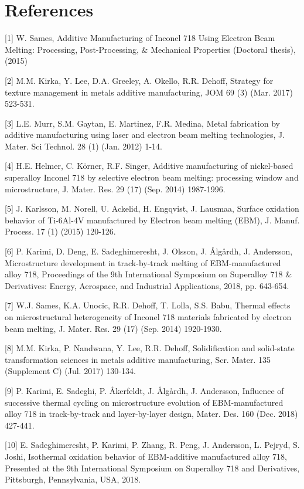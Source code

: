 \documentclass[10pt]{article}
\begin{document}
\section*{References}
[1] W. Sames, Additive Manufacturing of Inconel 718 Using Electron Beam Melting: Processing, Post-Processing, \& Mechanical Properties (Doctoral thesis), (2015)

[2] M.M. Kirka, Y. Lee, D.A. Greeley, A. Okello, R.R. Dehoff, Strategy for texture management in metals additive manufacturing, JOM 69 (3) (Mar. 2017) 523-531.

[3] L.E. Murr, S.M. Gaytan, E. Martinez, F.R. Medina, Metal fabrication by additive manufacturing using laser and electron beam melting technologies, J. Mater. Sci Technol. 28 (1) (Jan. 2012) 1-14.

[4] H.E. Helmer, C. Körner, R.F. Singer, Additive manufacturing of nickel-based superalloy Inconel 718 by selective electron beam melting: processing window and microstructure, J. Mater. Res. 29 (17) (Sep. 2014) 1987-1996.

[5] J. Karlsson, M. Norell, U. Ackelid, H. Engqvist, J. Lausmaa, Surface oxidation behavior of Ti-6Al-4V manufactured by Electron beam melting (EBM), J. Manuf. Process. 17 (1) (2015) 120-126.

[6] P. Karimi, D. Deng, E. Sadeghimeresht, J. Olsson, J. Ålgårdh, J. Andersson, Microstructure development in track-by-track melting of EBM-manufactured alloy 718, Proceedings of the 9th International Symposium on Superalloy 718 \& Derivatives: Energy, Aerospace, and Industrial Applications, 2018, pp. 643-654.

[7] W.J. Sames, K.A. Unocic, R.R. Dehoff, T. Lolla, S.S. Babu, Thermal effects on microstructural heterogeneity of Inconel 718 materials fabricated by electron beam melting, J. Mater. Res. 29 (17) (Sep. 2014) 1920-1930.

[8] M.M. Kirka, P. Nandwana, Y. Lee, R.R. Dehoff, Solidification and solid-state transformation sciences in metals additive manufacturing, Scr. Mater. 135 (Supplement C) (Jul. 2017) 130-134.

[9] P. Karimi, E. Sadeghi, P. Åkerfeldt, J. Ålgårdh, J. Andersson, Influence of successive thermal cycling on microstructure evolution of EBM-manufactured alloy 718 in track-by-track and layer-by-layer design, Mater. Des. 160 (Dec. 2018) 427-441.

[10] E. Sadeghimeresht, P. Karimi, P. Zhang, R. Peng, J. Andersson, L. Pejryd, S. Joshi, Isothermal oxidation behavior of EBM-additive manufactured alloy 718, Presented at the 9th International Symposium on Superalloy 718 and Derivatives, Pittsburgh, Pennsylvania, USA, 2018.
\end{document}
